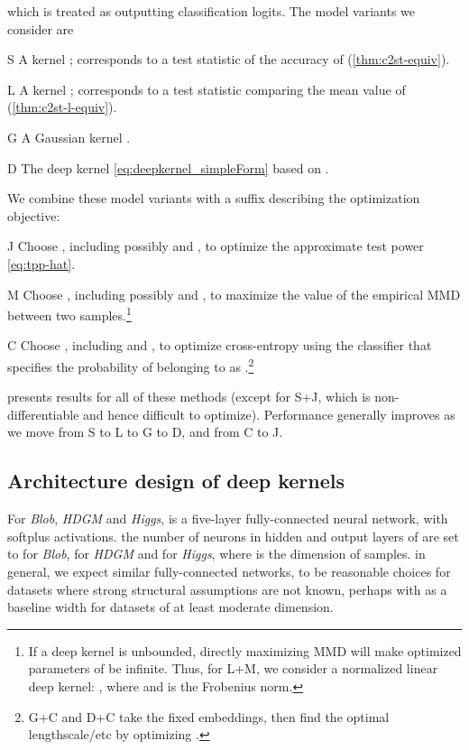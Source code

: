 \documentclass{article}
\begin{document}
which is treated as outputting classification logits.
The model variants we consider are
\begin{compactdesc}
\item[S] A kernel ; corresponds to a test statistic of the accuracy of  (\cref{thm:c2st-equiv}).
\item[L] A kernel ; corresponds to a test statistic comparing the mean value of  (\cref{thm:c2st-l-equiv}).
\item[G] A Gaussian kernel .
\item[D] The deep kernel \eqref{eq:deepkernel_simpleForm} based on .
\end{compactdesc}
We combine these model variants with a suffix describing the optimization objective:
\begin{compactdesc}
    \item[J] Choose , including possibly  and , to optimize the approximate test power \eqref{eq:tpp-hat}.
    \item[M] Choose , including possibly  and , to maximize the value of the empirical MMD between two samples.\footnote{If a deep kernel is unbounded, directly maximizing MMD will make optimized parameters of  be infinite. Thus, for L+M, we consider a normalized linear deep kernel: , where  and  is the Frobenius norm.}
    \item[C] Choose , including  and , to optimize cross-entropy using the classifier that specifies the probability of  belonging to  as .\footnote{G+C and D+C take the fixed  embeddings, then find the optimal lengthscale/etc by optimizing .}
\end{compactdesc}


 presents results for all of these methods
(except for S+J, which is non-differentiable and hence difficult to optimize).
Performance generally improves
as we move from S to L to G to D,
and from C to J.

\subsection{Architecture design of deep kernels}
For \emph{Blob}, \emph{HDGM} and \emph{Higgs},  is a five-layer fully-connected neural network, with softplus activations. the number of neurons in hidden and output layers of  are set to  for \emph{Blob},  for \emph{HDGM} and  for \emph{Higgs}, where  is the dimension of samples.
in general, we expect similar fully-connected networks,
to be reasonable choices for datasets where strong structural assumptions are not known,
perhaps with  as a baseline width for datasets of at least moderate dimension.
\end{document}
